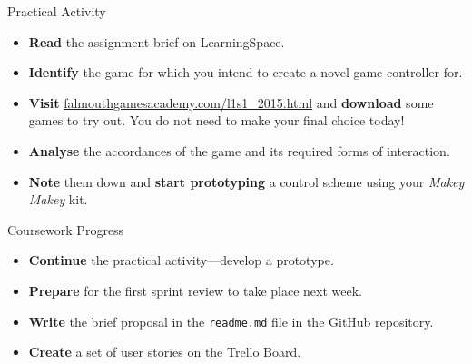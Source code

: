 \documentclass[xcolor={dvipsnames}]{beamer}\usepackage{etoolbox}\newtoggle{printable}\togglefalse{printable}
\begin{document}
\begin{frame}{Practical Activity}
	\begin{itemize}
		\item \textbf{Read} the assignment brief on LearningSpace.
		\item \textbf{Identify} the game for which you intend to create a novel game controller for.
		\item \textbf{Visit} \url{falmouthgamesacademy.com/l1s1_2015.html} 
		and \textbf{download} some games to try out. You do not need to make your final choice today!
		\item \textbf{Analyse} the accordances of the game and its required forms of interaction.
		\item \textbf{Note} them down and \textbf{start prototyping} a control scheme using your \textit{Makey Makey} kit.
	\end{itemize}
\end{frame}

\begin{frame}{Coursework Progress}
	\begin{itemize}
		\item \textbf{Continue} the practical activity---develop a prototype.
		\item \textbf{Prepare} for the first sprint review to take place next week.
		\item \textbf{Write} the brief proposal in the \texttt{readme.md} file in the GitHub repository. 
		\item \textbf{Create} a set of user stories on the Trello Board. 
	\end{itemize}
\end{frame}


%
\end{document}
